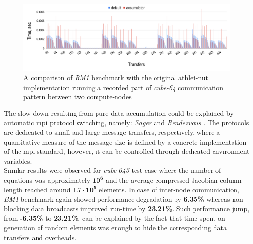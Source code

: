 \begin{figure}[htpb]
  \centering
  \includegraphics[width=1.0\textwidth]{figures/chapter-3/benchmark-result-non-blocking-inter-node-comm.png}
  \caption{A comparison of \textit{BM1} benchmark with the original \acrshort{athlet}-\acrshort{nut} implementation running a recorded part of \textit{cube-64} communication pattern between two compute-nodes}
\label{fig:benchmark:results-cube-64-inter-node-comm}
\end{figure}


The slow-down resulting from pure data accumulation could be explained by automatic \acrshort{mpi} protocol switching, namely: \textit{Eager} and \textit{Rendezvous} \cite{mpi:protocols-explanation}. The protocols are dedicated to small and large message transfers, respectively, where a quantitative measure of the message size is defined by a concrete implementation of the \acrshort{mpi} standard, however, it can be controlled through dedicated environment variables.\\



Similar results were observed for \textit{cube-645} test case where the number of equations was approximately $\bm{10^6}$ and the average compressed Jacobian column length reached around $\bm{1.7 \cdot 10^5}$ elements. In case of  inter-node communication, \textit{BM1} benchmark again showed performance degradation by \textbf{6.35\%} whereas non-blocking data broadcasts improved run-time by \textbf{23.21\%}. Such performance jump, from \textbf{-6.35\%} to \textbf{23.21\%}, can be explained by the fact that time spent on generation of random elements was enough to hide the corresponding data transfers and overheads.\\



